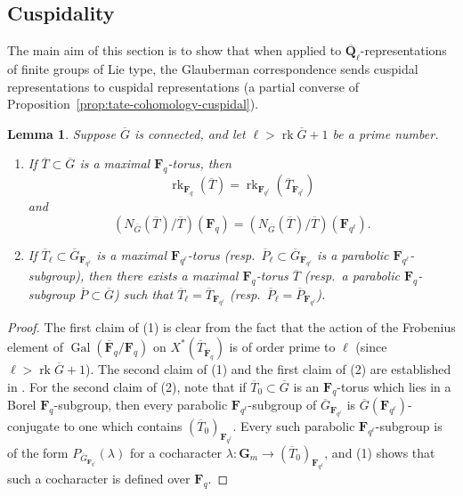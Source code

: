 \documentclass[reqno]{amsart}
\numberwithin{equation}{subsection}
\newcommand{\F}{\mathbf{F}}
\newcommand{\G}{\mathbf{G}}
\newcommand{\Q}{\mathbf{Q}}
\newcommand{\Gal}{\operatorname{Gal}}
\newcommand{\ol}[1]{\overline{#1}}
\newcommand{\co}{\colon}
\DeclareMathOperator{\rk}{rk}
\newtheorem{lemma}[thm]{Lemma}
\theoremstyle{remark}
\numberwithin{equation}{subsection}
\numberwithin{figure}{subsection}
\begin{document}
\subsection{Cuspidality}

The main aim of this section is to show that when applied to $\ol\Q_\ell$-representations of finite groups of Lie type, the Glauberman correspondence sends cuspidal representations to cuspidal representations (a partial converse of Proposition~\ref{prop:tate-cohomology-cuspidal}).

\begin{lemma}\label{lemma:split-rank-stays-same}
    Suppose $\ol G$ is connected, and let $\ell > \rk \ol G + 1$ be a prime number.
    \begin{enumerate}
        \item If $\ol T \subset \ol G$ is a maximal $\F_q$-torus, then
        \[
        \rk_{\F_q}(\ol T) = \rk_{\F_{q^\ell}}(\ol T_{\F_{q^\ell}})
        \]
        and
        \[
        (N_{\ol G}(\ol T)/\ol T)(\F_q) = (N_{\ol G}(\ol T)/\ol T)(\F_{q^\ell}).
        \]
        \item If $\ol T_\ell \subset \ol G_{\F_{q^\ell}}$ is a maximal $\F_{q^\ell}$-torus (resp.\ $\ol P_\ell \subset \ol G_{\F_{q^\ell}}$ is a parabolic $\F_{q^\ell}$-subgroup), then there exists a maximal $\F_q$-torus $\ol T$ (resp.\ a parabolic $\F_q$-subgroup $\ol P \subset \ol G$) such that $\ol T_\ell = \ol T_{\F_{q^\ell}}$ (resp.\ $\ol P_\ell = \ol P_{\F_{q^\ell}}$).
    \end{enumerate}
\end{lemma}

\begin{proof}
    The first claim of (1) is clear from the fact that the action of the Frobenius element of $\Gal(\ol\F_q/\F_q)$ on $X^*(\ol T_{\ol\F_q})$ is of order prime to $\ell$ (since $\ell > \rk \ol G + 1$). The second claim of (1) and the first claim of (2) are established in \cite[Lemma~2.5]{Cot26a}. For the second claim of (2), note that if $\ol T_0 \subset \ol G$ is an $\F_q$-torus which lies in a Borel $\F_q$-subgroup, then every parabolic $\F_{q^\ell}$-subgroup of $\ol G_{\F_{q^\ell}}$ is $\ol G(\F_{q^\ell})$-conjugate to one which contains $(\ol T_0)_{\F_{q^\ell}}$. Every such parabolic $\F_{q^\ell}$-subgroup is of the form $P_{\ol G_{\F_{q^\ell}}}(\lambda)$ for a cocharacter $\lambda\co \G_m \to (\ol T_0)_{\F_{q^\ell}}$, and (1) shows that such a cocharacter is defined over $\F_q$.
\end{proof}
\end{document}
